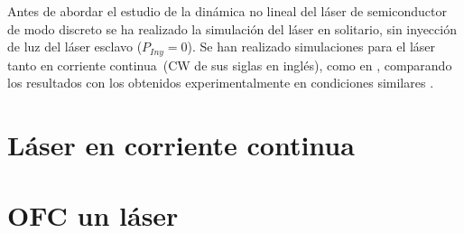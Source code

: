 \graphicspath{{../Graphics/Cpt1-Charactz/}}

\newcommand{\cw}{corriente continua}

Antes de abordar el estudio de la dinámica no lineal del láser de semiconductor de modo discreto se ha realizado la simulación del láser en solitario, sin inyección de luz del láser esclavo ($P_{Iny} = 0$). Se han realizado simulaciones para el láser tanto en \cw\ (CW de sus siglas en inglés), como en \gs, comparando los resultados con los obtenidos experimentalmente en condiciones similares \cite{Chaves19}.

	\section{Láser en \cw}
		\label{Sol:CW}
		
		

	\section{OFC un l\'aser \gs}
		\label{Sol:OFC}

		

